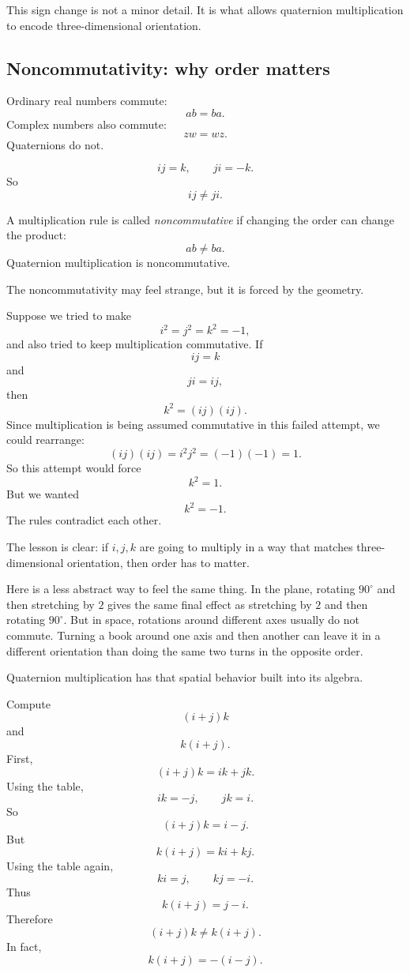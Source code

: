 This sign change is not a minor detail.  It is what allows quaternion multiplication to
encode three-dimensional orientation.

\subsection{Noncommutativity: why order matters}

Ordinary real numbers commute:
\[
    ab=ba.
\]
Complex numbers also commute:
\[
    zw=wz.
\]
Quaternions do not.

\[
    ij=k,
    \qquad
    ji=-k.
\]
So
\[
    ij\neq ji.
\]

\begin{definition}
A multiplication rule is called \emph{noncommutative} if changing the order can change
the product:
\[
    ab\neq ba.
\]
Quaternion multiplication is noncommutative.
\end{definition}

The noncommutativity may feel strange, but it is forced by the geometry.

\begin{example}
Suppose we tried to make
\[
    i^2=j^2=k^2=-1,
\]
and also tried to keep multiplication commutative.  If
\[
    ij=k
\]
and
\[
    ji=ij,
\]
then
\[
    k^2=(ij)(ij).
\]
Since multiplication is being assumed commutative in this failed attempt, we could rearrange:
\[
    (ij)(ij)=i^2j^2=(-1)(-1)=1.
\]
So this attempt would force
\[
    k^2=1.
\]
But we wanted
\[
    k^2=-1.
\]
The rules contradict each other.

The lesson is clear: if \(i,j,k\) are going to multiply in a way that matches
three-dimensional orientation, then order has to matter.
\end{example}

Here is a less abstract way to feel the same thing.  In the plane, rotating \(90^\circ\)
and then stretching by \(2\) gives the same final effect as stretching by \(2\) and then
rotating \(90^\circ\).  But in space, rotations around different axes usually do not commute.
Turning a book around one axis and then another can leave it in a different orientation
than doing the same two turns in the opposite order.

Quaternion multiplication has that spatial behavior built into its algebra.

\begin{example}
Compute
\[
    (i+j)k
\]
and
\[
    k(i+j).
\]
First,
\[
    (i+j)k=ik+jk.
\]
Using the table,
\[
    ik=-j,\qquad jk=i.
\]
So
\[
    (i+j)k=i-j.
\]
But
\[
    k(i+j)=ki+kj.
\]
Using the table again,
\[
    ki=j,\qquad kj=-i.
\]
Thus
\[
    k(i+j)=j-i.
\]
Therefore
\[
    (i+j)k\neq k(i+j).
\]
In fact,
\[
    k(i+j)=-(i-j).
\]
\end{example}

